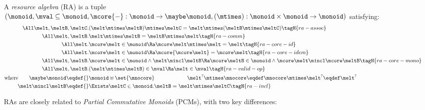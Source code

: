 \begin{defn}
  A \emph{resource algebra} (RA) is a tuple \\
  $(\monoid, \mval \subseteq \monoid, \mcore{{-}}:
  \monoid \to \maybe\monoid, (\mtimes) : \monoid \times \monoid \to \monoid)$ satisfying:
  \begin{align*}
    \All \melt, \meltB, \meltC.& (\melt \mtimes \meltB) \mtimes \meltC = \melt \mtimes (\meltB \mtimes \meltC) \tagH{ra-assoc} \\
    \All \melt, \meltB.& \melt \mtimes \meltB = \meltB \mtimes \melt \tagH{ra-comm} \\
    \All \melt.& \mcore\melt \in \monoid \Ra \mcore\melt \mtimes \melt = \melt \tagH{ra-core-id} \\
    \All \melt.& \mcore\melt \in \monoid \Ra \mcore{\mcore\melt} = \mcore\melt \tagH{ra-core-idem} \\
    \All \melt, \meltB.& \mcore\melt \in \monoid \land \melt \mincl \meltB \Ra \mcore\meltB \in \monoid \land \mcore\melt \mincl \mcore\meltB \tagH{ra-core-mono} \\
    \All \melt, \meltB.& (\melt \mtimes \meltB) \in \mval \Ra \melt \in \mval \tagH{ra-valid-op} \\
    \text{where}\qquad %
    \maybe\monoid \eqdef{}& \monoid \uplus \set{\mnocore} \qquad\qquad\qquad \melt^? \mtimes \mnocore \eqdef \mnocore \mtimes \melt^? \eqdef \melt^? \\
    \melt \mincl \meltB \eqdef{}& \Exists \meltC \in \monoid. \meltB = \melt \mtimes \meltC \tagH{ra-incl}
  \end{align*}
\end{defn}
\noindent
RAs are closely related to \emph{Partial Commutative Monoids} (PCMs), with two key differences:
